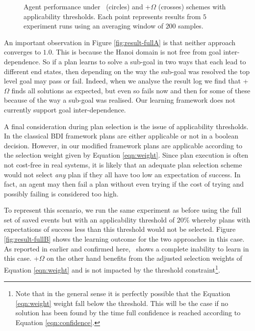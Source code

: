 \begin{figure*}[t]
\begin{center}
\qquad
{}
\caption{Agent performance under \CL\ (circles) and \CL+$\Omega$ (crosses) schemes with applicability thresholds. Each point represents results from $5$ experiment runs using an averaging window of $200$ samples.}
\label{fig:result-full}
\end{center}
\end{figure*}


An important observation in Figure \ref{fig:result-fullA} is that neither approach converges to $1.0$. This is because the Hanoi domain is not free from goal inter-dependence. So if a plan learns to solve a sub-goal in two ways that each lead to different end states, then depending on the way the sub-goal was resolved the top level goal may pass or fail. Indeed, when we analyse the result log we find that \CL+$\Omega$ finds all solutions as expected, but even so fails now and then for some of these because of the way a sub-goal was realised. Our learning framework does not currently support goal inter-dependence.

A final consideration during plan selection is the issue of applicability thresholds. In the classical BDI framework plans are either applicable or not in a boolean decision. However, in our modified framework plans are applicable according to the selection weight given by Equation \ref{eqn:weight}. Since plan execution is often not cost-free in real systems, it is likely that an adequate plan selection scheme would not select \textit{any} plan if they all have too low an expectation of success. In fact, an agent may then fail a plan without even trying if the cost of trying and possibly failing is considered too high. 

To represent this scenario, we run the same experiment as before using the full set of saved  events but with an applicability threshold of $20\%$ whereby plans with expectations of success less than this threshold would not be selected. Figure \ref{fig:result-fullB} shows the learning outcome for the two approaches in this case. As reported in \cite{Singh:AAMAS10} earlier and confirmed here, \CL\ shows a complete inability to learn in this case. \CL+$\Omega$ on the other hand benefits from the adjusted selection weights of Equation \ref{eqn:weight} and is not impacted by the threshold constraint\footnote{Note that in the general sense it is perfectly possible that the Equation \ref{eqn:weight} weight fall below the threshold. This will be the case if no solution has been found by the time full confidence is reached according to Equation \ref{eqn:confidence}.}.

